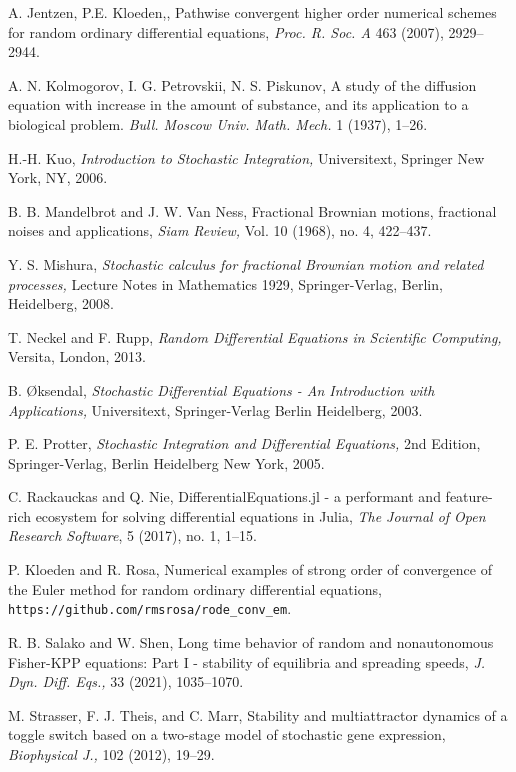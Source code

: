 \documentclass[reqno,12pt]{amsart}
\theoremstyle{plain} %
\theoremstyle{definition} %
\begin{document}
\begin{thebibliography}{25}
     A. Jentzen, P.E. Kloeden,, Pathwise convergent higher order numerical schemes for random ordinary differential equations, \emph{Proc. R. Soc. A} 463 (2007), 2929--2944.

     A. N. Kolmogorov, I. G. Petrovskii, N. S. Piskunov, A study of the diffusion equation with increase in the amount of substance, and its application to a biological problem. \emph{Bull. Moscow Univ. Math. Mech.} 1 (1937), 1--26.

     H.-H. Kuo, \emph{Introduction to Stochastic Integration,} Universitext, Springer New York, NY, 2006.

     B. B. Mandelbrot and J. W. Van Ness, Fractional Brownian motions, fractional noises and applications, \emph{Siam Review,} Vol. 10 (1968), no. 4, 422--437.

     Y. S. Mishura, \emph{Stochastic calculus for fractional Brownian motion and related processes,} Lecture Notes in Mathematics 1929, Springer-Verlag, Berlin, Heidelberg, 2008.

     T. Neckel and F. Rupp, \emph{Random Differential Equations in Scientific Computing,} Versita, London, 2013.

     B. {\O}ksendal, \emph{Stochastic Differential Equations - An Introduction with Applications,} Universitext, Springer-Verlag Berlin Heidelberg, 2003.

     P. E. Protter, \emph{Stochastic Integration and Differential Equations,} 2nd Edition, Springer-Verlag, Berlin Heidelberg New York, 2005.

     C. Rackauckas and Q. Nie, DifferentialEquations.jl - a performant and feature-rich ecosystem for solving differential equations in Julia, \emph{The Journal of Open Research Software}, 5 (2017), no. 1, 1--15.

     P. Kloeden and R. Rosa, Numerical examples of strong order of convergence of the Euler method for random ordinary differential equations, \texttt{https://github.com/rmsrosa/rode\_conv\_em}.

     R. B. Salako and W. Shen, Long time behavior of random and nonautonomous Fisher-KPP equations: Part I - stability of equilibria and spreading speeds, \emph{J. Dyn. Diff. Eqs.,} 33 (2021), 1035--1070.

     M. Strasser, F. J. Theis, and C. Marr, Stability and multiattractor dynamics of a toggle switch based on a two-stage model of stochastic gene expression, \emph{Biophysical J.,} 102 (2012), 19--29.


\end{thebibliography}
\end{document}
